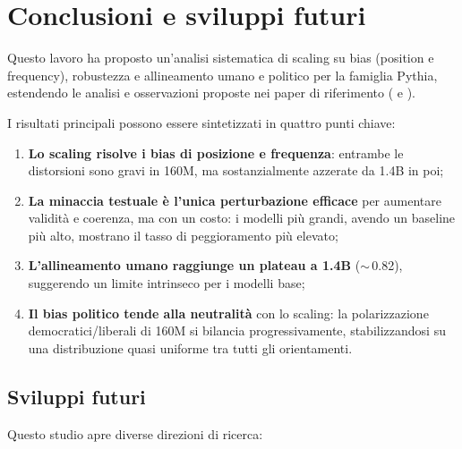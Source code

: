 \documentclass[../relazione.tex]{subfiles}
\begin{document}
\section{Conclusioni e sviluppi futuri}

Questo lavoro ha proposto un'analisi sistematica di scaling su bias (position e frequency), robustezza e allineamento umano e politico per la famiglia Pythia, estendendo le analisi e osservazioni proposte nei paper di riferimento (\cite{santurkar2023whose} e \cite{rottger2024political}).

I risultati principali possono essere sintetizzati in quattro punti chiave:
\begin{enumerate}
    \item \textbf{Lo scaling risolve i bias di posizione e frequenza}: entrambe le distorsioni sono gravi in 160M, ma sostanzialmente azzerate da 1.4B in poi;
    \item \textbf{La minaccia testuale è l'unica perturbazione efficace} per aumentare validità e coerenza, ma con un costo: i modelli più grandi, avendo un baseline più alto, mostrano il tasso di peggioramento più elevato;
    \item \textbf{L'allineamento umano raggiunge un plateau a 1.4B} ($\sim$\,0.82), suggerendo un limite intrinseco per i modelli base;
    \item \textbf{Il bias politico tende alla neutralità} con lo scaling: la polarizzazione democratici/liberali di 160M si bilancia progressivamente, stabilizzandosi su una distribuzione quasi uniforme tra tutti gli orientamenti.
\end{enumerate}

\subsection{Sviluppi futuri}
Questo studio apre diverse direzioni di ricerca:
\end{document}

